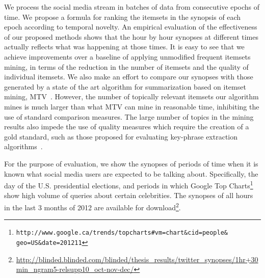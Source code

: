 \documentclass{sig-alternate}
\begin{document}
We process the social media stream in batches 
of data from consecutive epochs of time.
We propose a formula for ranking the itemsets
in the synopsis of each epoch according to temporal novelty.
An empirical evaluation of the effectiveness of our proposed methods
shows that the hour by hour synopses at different times %
actually reflects what was happening at those times. %
It is easy to see that
we achieve improvements over a baseline
of applying unmodified frequent itemsets mining, 
in terms of the reduction in the number of itemsets 
and the quality of individual itemsets.
We also make an effort to compare our synopses 
with those generated by a state of the art algorithm 
for summarization based on itemset mining, MTV~\cite{mampaey2011tell}.
However, the number of topically relevant itemsets our algorithm mines 
is much larger than what MTV can mine in reasonable time,
inhibiting the use of standard comparison measures.
The large number of topics in the mining results 
also impede the use of quality measures which require %
the creation of a gold standard, 
such as those proposed for evaluating
key-phrase extraction algorithms~\cite{Zhao:2011:TKE:2002472.2002521}.

For the purpose of evaluation, we show the 
synopses 
of periods of time when it is known what %
social media users are expected to be talking about.
Specifically, the day of the U.S. presidential elections,
and periods in which Google Top Charts\footnote{\scriptsize \texttt{http://www.google.ca/trends/topcharts\#vm=chart\&cid=people\&\\geo=US\&date=201211}}
show high volume of queries about certain celebrities.
The synopses of all hours in the last 3 months of 2012
are available for download\footnote{\scriptsize \url{http://blinded.blinded.com/blinded/thesis_results/twitter_synopses/1hr+30min_ngram5-relsupp10_oct-nov-dec/}}. 

\end{document}
